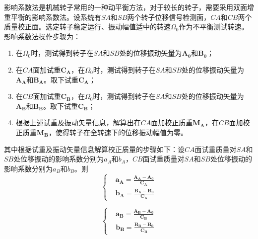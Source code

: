 \documentclass[
  lang=cn,
  degree=master,
  openany,oneside
]{nuaathesis}
\begin{document}
影响系数法是机械转子常用的一种动平衡方法，对于较长的转子，需要采用双面增重平衡的影响系数法。设系统有$SA$和$SB$两个转子位移信号检测面，$CA$和$CB$两个质量校正面。选定转子稳定运行、振动幅值适中的转速$\Omega _0$作为不平衡测试转速。影响系数法操作步骤为：
\begin{enumerate}
	\item 在$\Omega _0$时，测试得到转子在$SA$和$SB$处的位移振动矢量为${\boldsymbol{A_0}}$和${\boldsymbol{B_0}}$；
	\item 在$CA$面加试重${\boldsymbol{C_A}}$，在$\Omega _0$时，测试得到转子在$SA$和$SB$处的位移振动矢量为${\boldsymbol{A_A}}$和${\boldsymbol{B_A}}$。取下试重${\boldsymbol{C_A}}$；
	\item 在$CB$面加试重${\boldsymbol{C_B}}$，在$\Omega _0$时，测试得到转子在$SA$和$SB$处的位移振动矢量为${\boldsymbol{A_B}}$和${\boldsymbol{B_B}}$。取下试重${\boldsymbol{C_B}}$；
	\item 根据上述试重及振动矢量信息，解算出在$CA$面加校正质重${\boldsymbol{M_A}}$，在$CB$面加校正质重${\boldsymbol{M_B}}$，使得转子在全转速下的位移振动幅值为零。
\end{enumerate}

其中根据试重及振动矢量信息解算校正质量的步骤如下：设$CA$面试重质量对$SA$和$SB$处位移振动的影响系数分别为$a_A$和$b_A$，$CB$面试重质量对$SA$和$SB$处位移振动的影响系数分别为$a_B$和$b_B$。则
\begin{equation}
\left\{
\begin{aligned}
&	{\boldsymbol{a_A}} = \frac{{\boldsymbol{A_A}}-{\boldsymbol{A_0}}}{{\boldsymbol{C_A}}} \\
&		{\boldsymbol{b_A}} = \frac{{\boldsymbol{B_A}}-{\boldsymbol{B_0}}}{{\boldsymbol{C_A}}}
\end{aligned}
\right.
\end{equation}

\begin{equation}
\left\{
\begin{aligned}
&	{\boldsymbol{a_B}} = \frac{{\boldsymbol{A_B}}-{\boldsymbol{A_0}}}{{\boldsymbol{C_B}}} \\
&		{\boldsymbol{b_B}} = \frac{{\boldsymbol{B_B}}-{\boldsymbol{B_0}}}{{\boldsymbol{C_B}}}
\end{aligned}
\right.
\end{equation}
\end{document}
